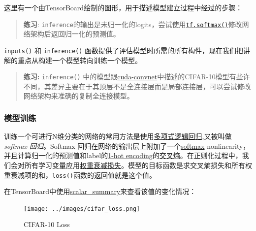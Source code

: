 这里有一个由TensorBoard绘制的图形，用于描述模型建立过程中经过的步骤：

\begin{quote}
\textbf{练习}:
\texttt{inference}的输出是未归一化的logits，尝试使用\href{tensorflow-zh/SOURCE/api_docs/python/nn.md\#softmax}{\texttt{tf.softmax()}}修改网络架构后返回归一化的预测值。
\end{quote}

\texttt{inputs()} 和 \texttt{inference()}
函数提供了评估模型时所需的所有构件，现在我们把讲解的重点从构建一个模型转向训练一个模型。

\begin{quote}
\textbf{练习:} \texttt{inference()}
中的模型跟\href{https://code.google.com/p/cuda-convnet/}{cuda-convnet}中描述的CIFAR-10模型有些许不同，其差异主要在于其顶层不是全连接层而是局部连接层，可以尝试修改网络架构来准确的复制全连接模型。
\end{quote}

\subsubsection{模型训练 }\label{ux6a21ux578bux8badux7ec3}

训练一个可进行N维分类的网络的常用方法是使用\href{https://en.wikipedia.org/wiki/Multinomial_logistic_regression}{多项式逻辑回归},又被叫做\emph{softmax
回归}。Softmax
回归在网络的输出层上附加了一个\href{https://github.com/jikexueyuanwiki/tensorflow-zh/blob/master/SOURCE/api_docs/python/nn.md\#softmax}{softmax}
nonlinearity，并且计算归一化的预测值和label的\href{https://github.com/jikexueyuanwiki/tensorflow-zh/blob/master/SOURCE/api_docs/python/sparse_ops.md\#sparse_to_dense}{1-hot
encoding}的\href{https://github.com/jikexueyuanwiki/tensorflow-zh/blob/master/SOURCE/api_docs/python/nn.md\#softmax_cross_entropy_with_logits}{交叉熵}。在正则化过程中，我们会对所有学习变量应用\href{https://github.com/jikexueyuanwiki/tensorflow-zh/blob/master/SOURCE/api_docs/python/nn.md\#l2_loss}{权重衰减损失}。模型的目标函数是求交叉熵损失和所有权重衰减项的和，\texttt{loss()}函数的返回值就是这个值。

在TensorBoard中使用\href{https://github.com/jikexueyuanwiki/tensorflow-zh/blob/master/SOURCE/api_docs/python/train.md\#scalar_summary}{scalar\_summary}来查看该值的变化情况：

\begin{figure}[htbp]
\centering
\texttt{[image: ../images/cifar\_loss.png]}
\caption{CIFAR-10 Loss}
\end{figure}

